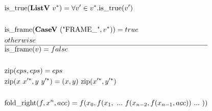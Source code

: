 \begin{align*}
  &\istrue(\listv ~ \seq v) = \forall v' \in \seq v. \istrue (v') \\
%
\newline \\
  &\isframe(\casev ~ (\text{"FRAME\_"}, \seq v)) = true \\
  &otherwise \\
  \hline
  &\isframe(v) = false \\
%
\newline \\
  &\zip(eps, eps) = eps \\
  &\zip(x ~ \seq{x'}, y ~ \seq{y'}) = (x, y) ~ \zip (\seq{x'}, \seq{y'}) \\
%
\newline \\
  &\fold(f, x^n, acc) = f(x_0, f(x_1, ~ ... ~ f(x_{n-2}, f(x_{n-1}, acc)) ~ ... ~ ))
\end{align*}





